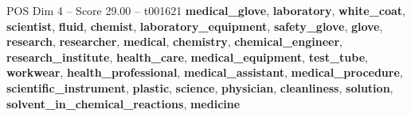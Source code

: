 \begin{textsample}{POS Dim 4 – Score 29.00 – t001621}  \label{ex:f4_pos_024}
\textbf{medical\_glove}, \textbf{laboratory}, \textbf{white\_coat}, \textbf{scientist}, \textbf{fluid}, \textbf{chemist}, \textbf{laboratory\_equipment}, \textbf{safety\_glove}, \textbf{glove}, \textbf{research}, \textbf{researcher}, \textbf{medical}, \textbf{chemistry}, \textbf{chemical\_engineer}, \textbf{research\_institute}, \textbf{health\_care}, \textbf{medical\_equipment}, \textbf{test\_tube}, \textbf{workwear}, \textbf{health\_professional}, \textbf{medical\_assistant}, \textbf{medical\_procedure}, \textbf{scientific\_instrument}, \textbf{plastic}, \textbf{science}, \textbf{physician}, \textbf{cleanliness}, \textbf{solution}, \textbf{solvent\_in\_chemical\_reactions}, \textbf{medicine}

\end{textsample}
